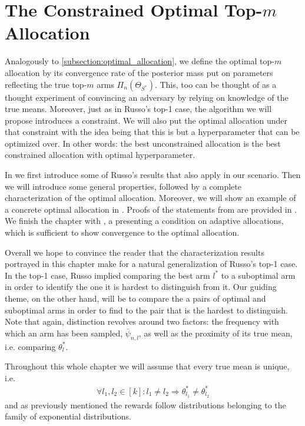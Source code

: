 \chapter{The Constrained Optimal Top-$m$ Allocation}\label{chapter:optimal}
Analogously to \ref{subsection:optimal_allocation}, we define the optimal
top-$m$ allocation by its convergence rate of the posterior mass put on
parameters reflecting the true top-$m$ arms $\Pi_n(\Theta_{S^*})$. This, too can
be thought of as a thought experiment of convincing an adversary by relying on
knowledge of the true means.  Moreover, just as in Russo's top-1 case, the
algorithm we will propose introduces a constraint. We will also put the optimal
allocation under that constraint with the idea being that this is but a
hyperparameter that can be optimized over. In other words: the best
unconstrained allocation is the best constrained allocation with optimal
hyperparameter.

In  we first introduce some of Russo's results
that also apply in our scenario. Then we will introduce some general properties,
followed by a complete characterization of the optimal allocation. Moreover, we
will show an example of a concrete optimal allocation in
. Proofs of the statements from
 are provided in .
We finish the chapter with , a
presenting a condition on adaptive allocations, which is sufficient to show
convergence to the optimal allocation.

Overall we hope to convince the reader that the characterization results
portrayed in this chapter make for a natural generalization of Russo's top-1
case. In the top-1 case, Russo implied comparing the best arm $l^*$ to a
suboptimal arm in order to identify the one it is hardest to distinguish from
it. Our guiding theme, on the other hand, will be to compare the a pairs of
optimal and suboptimal arms in order to find to the pair that is the hardest to
distinguish. Note that again, distinction revolves around two factors: the
frequency with which an arm has been sampled, $\bar{\psi}_{n, l}$, as well as
the proximity of its true mean, i.e. comparing $\theta^*_l$.

Throughout this whole chapter we will assume that every true mean is unique,
i.e.
\begin{align}
  \forall l_1, l_2 \in [k]: l_1 \neq l_2 \Rightarrow \theta^*_{l_1} \neq
      \theta^*_{l_2}
\end{align}
and as previously mentioned the rewards follow distributions belonging to the
family of exponential distributions.

